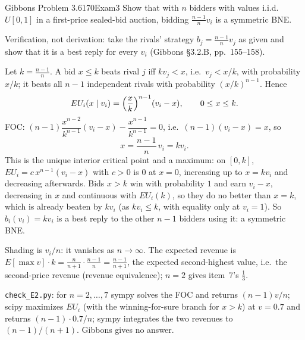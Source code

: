 \begin{exsol}{Gibbons Problem 3.6}{170}{Exam}{3}
\asked Show that with $n$ bidders with values i.i.d.\ $U[0,1]$ in a first-price sealed-bid
auction, bidding $\frac{n-1}{n}v_i$ is a symmetric BNE.

\method Verification, not derivation: take the rivals' strategy $b_j=\frac{n-1}{n}v_j$ as given and
show that it is a best reply for every $v_i$ (Gibbons \S3.2.B, pp.~155--158).

\solution
Let $k=\frac{n-1}{n}$. A bid $x\le k$ beats rival $j$ iff $kv_j<x$, i.e.\ $v_j<x/k$, with probability
$x/k$; it beats all $n-1$ independent rivals with probability $(x/k)^{n-1}$. Hence
\[
  EU_i(x\mid v_i)=\Bigl(\frac xk\Bigr)^{n-1}(v_i-x),\qquad 0\le x\le k .
\]
FOC: $(n-1)\dfrac{x^{n-2}}{k^{n-1}}(v_i-x)-\dfrac{x^{n-1}}{k^{n-1}}=0$, i.e.\ $(n-1)(v_i-x)=x$, so
\[
  x=\frac{n-1}{n}\,v_i=kv_i .
\]
This is the unique interior critical point and a maximum: on $[0,k]$, $EU_i=c\,x^{n-1}(v_i-x)$ with
$c>0$ is $0$ at $x=0$, increasing up to $x=kv_i$ and decreasing afterwards. Bids $x>k$ win with
probability $1$ and earn $v_i-x$, decreasing in $x$ and continuous with $EU_i(k)$, so they do no
better than $x=k$, which is already beaten by $kv_i$ (as $kv_i\le k$, with equality only at $v_i=1$).
So $b_i(v_i)=kv_i$ is a best reply to the other $n-1$ bidders using it: a symmetric BNE.

\interp Shading is $v_i/n$: it vanishes as $n\to\infty$. The expected revenue is $E[\max v]\cdot k=
\frac{n}{n+1}\cdot\frac{n-1}{n}=\frac{n-1}{n+1}$, the expected second-highest value, i.e.\ the
second-price revenue (revenue equivalence); $n=2$ gives item~7's $\tfrac13$.

\verify \texttt{check\_E2.py}: for $n=2,\dots,7$ sympy solves the FOC and returns $(n-1)v/n$;
scipy maximizes $EU_i$ (with the winning-for-sure branch for $x>k$) at $v=0.7$ and returns
$(n-1)\cdot0.7/n$; sympy integrates the two revenues to $(n-1)/(n+1)$. Gibbons gives no answer.

\end{exsol}
